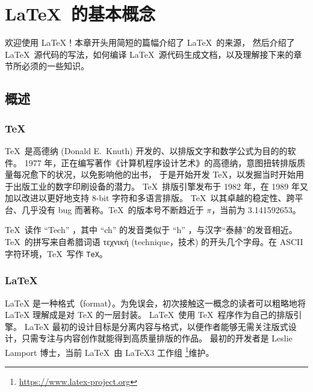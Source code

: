 \chapter{\LaTeX\ 的基本概念}\label{chap:basics}

\begin{intro}
欢迎使用 \LaTeX{}！本章开头用简短的篇幅介绍了 \LaTeX\ 的来源，
然后介绍了 \LaTeX\ 源代码的写法，如何编译 \LaTeX\ 源代码生成文档，以及理解接下来的章节所必须的一些知识。
\end{intro}

\section{概述}\label{sec:intro}

\subsection{\protect\TeX}\label{subsec:tex}

\TeX\ 是高德纳 (Donald E.~Knuth) 开发的、以排版文字和数学公式为目的的软件\cite{texbook}。
1977 年，正在编写著作《计算机程序设计艺术》的高德纳，意图扭转排版质量每况愈下的状况，以免影响他的出书，
于是开始开发 \TeX{}，以发掘当时开始用于出版工业的数字印刷设备的潜力。
\TeX\ 排版引擎发布于 1982 年，在 1989 年又加以改进以更好地支持 8-bit 字符和多语言排版。
\TeX\ 以其卓越的稳定性、跨平台、几乎没有 bug 而著称。\TeX\ 的版本号不断趋近于 $\pi$，当前为 3.141592653。

\TeX\ 读作 ``Tech'' ，其中 ``ch'' 的发音类似于 ``h'' ，与汉字“泰赫”的发音相近。\TeX\ 的拼写来自希腊词语
τεχνική (technique，技术) 的开头几个字母。在 ASCII 字符环境，\TeX\ 写作 \texttt{TeX}。

\subsection{\LaTeX}\label{subsec:latex}

\LaTeX{} 是一种格式（format）。为免误会，初次接触这一概念的读者可以粗略地将 \LaTeX{} 理解成是对 \TeX{} 的一层封装。
\LaTeX\ 使用 \TeX\ 程序作为自己的排版引擎。
\LaTeX{} 最初的设计目标是分离内容与格式，以便作者能够无需关注版式设计，只需专注与内容创作就能得到高质量排版的作品。
最初的开发者是 Leslie Lamport 博士\cite{manual}，当前 \LaTeX\ 由 \LaTeX 3 工作组%
\footnote{\url{https://www.latex-project.org}}维护。

